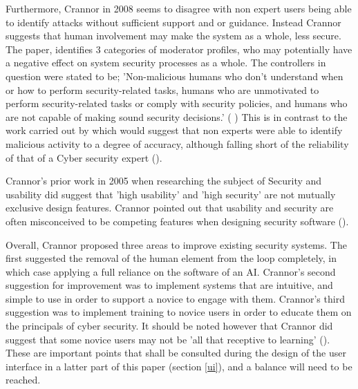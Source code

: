 Furthermore, Crannor in 2008 seems to disagree with non expert users being able to identify attacks without sufficient support and or guidance. Instead Crannor suggests that human involvement may make the system as a whole, less secure. The paper, identifies 3 categories of moderator profiles, who may potentially have a negative effect on system security processes as a whole. The controllers in question were stated to be; 'Non-malicious humans who don't understand when or how to perform security-related tasks, humans who are unmotivated to perform security-related tasks or comply with security policies, and humans who are  not capable of making sound security decisions.' (\citeauthor{cranor2008framework} \citeyear{cranor2008framework}) This is in contrast to the work carried out by \citeauthor{ben2015effects} which would suggest that non experts were able to identify malicious activity to a degree of accuracy, although falling short of the reliability of that of a Cyber security expert (\cite{ben2015effects}).
 
Crannor's prior work in 2005 when researching the subject of Security and usability did suggest that 'high usability' and 'high security' are not mutually exclusive design features. Crannor pointed out that usability and security are often misconceived to be competing features when designing security software (\cite{cranor2005security}).

Overall, Crannor proposed three areas to improve existing security systems. The first suggested the removal of the human element from the loop completely, in which case applying a full reliance on the software of an AI. Crannor's second suggestion for improvement was to implement systems that are intuitive, and simple to use in order to support a novice to engage with them. Crannor's third suggestion was to implement training to novice users in order to educate them on the principals of cyber security. It should be noted however that Crannor did suggest that some novice users may not be 'all that receptive to learning' (\cite{cranor2008framework}). These are important points that shall be consulted during the design of the user interface in a latter part of this paper (section \ref{ui}), and a balance will need to be reached. 
